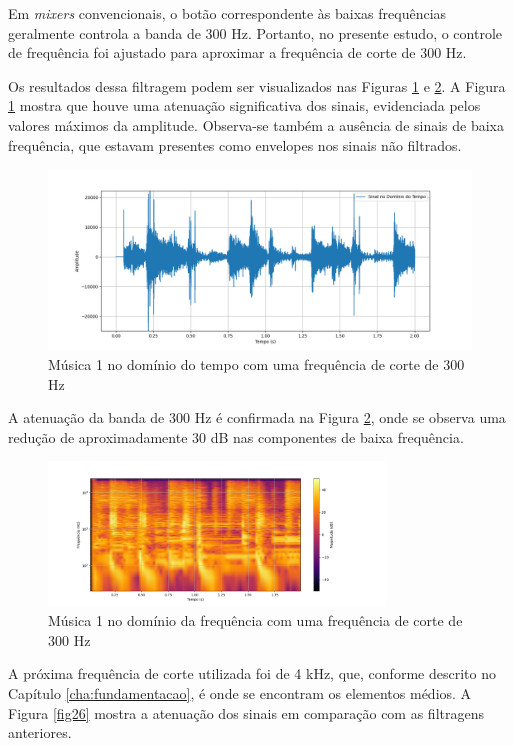 Em \textit{mixers} convencionais, o botão correspondente às baixas frequências geralmente controla a banda de 300 Hz. Portanto, no presente estudo, o controle de frequência foi ajustado para aproximar a frequência de corte de 300 Hz.

Os resultados dessa filtragem podem ser visualizados nas Figuras \ref{fig28} e \ref{fig29}. A Figura \ref{fig28} mostra que houve uma atenuação significativa dos sinais, evidenciada pelos valores máximos da amplitude. Observa-se também a ausência de sinais de baixa frequência, que estavam presentes como envelopes nos sinais não filtrados.

\begin{figure}[h]
    \centering
    \includegraphics[width=\textwidth]{figuras/fig28.png}
    \caption{Música 1 no domínio do tempo com uma frequência de corte de 300 Hz}
    \label{fig28}
\end{figure}

A atenuação da banda de 300 Hz é confirmada na Figura \ref{fig29}, onde se observa uma redução de aproximadamente 30 dB nas componentes de baixa frequência.

\begin{figure}[h]
    \centering
    \includegraphics[width=0.8\textwidth]{figuras/fig29.png}
    \caption{Música 1 no domínio da frequência com uma frequência de corte de 300 Hz}
    \label{fig29}
\end{figure}

A próxima frequência de corte utilizada foi de 4 kHz, que, conforme descrito no Capítulo \ref{cha:fundamentacao}, é onde se encontram os elementos médios. A Figura \ref{fig26} mostra a atenuação dos sinais em comparação com as filtragens anteriores.

